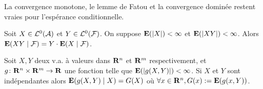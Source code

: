 \begin{pop}
	La convergence monotone, le lemme de Fatou et la convergence dominée restent vraies pour l'espérance conditionnelle.
\end{pop}

\begin{pop}
	Soit $X \in \mathcal{L}^0(\mathcal{A})$ et $Y \in \mathcal{L}^0(\mathcal{F})$.
	On suppose $\mathbf{E}(\left\lvert X\right\rvert) < \infty$ et $\mathbf{E}(\left\lvert XY\right\rvert) < \infty$.
	Alors $\mathbf{E}(XY \mid \mathcal{F}) = Y \cdot \mathbf{E}(X \mid \mathcal{F})$.
\end{pop}

\begin{pop}
	Soit $X,Y$ deux v.a. à valeurs dans $\mathbf{R}^n$ et $\mathbf{R}^m$ respectivement, et $g \colon \mathbf{R}^n \times \mathbf{R}^m \to \mathbf{R}$ une fonction telle que $\mathbf{E}(\left\lvert g(X,Y)\right\rvert) < \infty$.
	Si $X$ et $Y$ sont indépendantes alors $\mathbf{E}(g(X,Y) \mid X) = G(X)$ où $\forall x \in \mathbf{R}^n, G(x) := \mathbf{E}(g(x,Y))$.
\end{pop}
